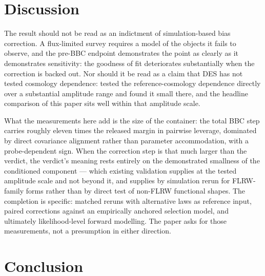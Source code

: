 \documentclass[11pt]{article}
\begin{document}
\section{Discussion}

The result should not be read as an indictment of simulation-based bias
correction. A flux-limited survey requires a model of the objects it
fails to observe, and the pre-BBC endpoint demonstrates the point as
clearly as it demonstrates sensitivity: the goodness of fit deteriorates
substantially when the correction is backed out. Nor should it be read as
a claim that DES has not tested cosmology dependence:
\citet{Camilleri2024} tested the reference-cosmology dependence directly
over a substantial amplitude range and found it small there, and the
headline comparison of this paper sits well within that amplitude scale.

What the measurements here add is the size of the container: the total
BBC step carries roughly eleven times the released margin in pairwise
leverage, dominated by direct covariance alignment rather than parameter
accommodation, with a probe-dependent sign. When the correction step is
that much larger than the verdict, the verdict's meaning rests entirely
on the demonstrated smallness of the conditioned component --- which
existing validation supplies at the tested amplitude scale and not
beyond it, and supplies by simulation rerun for FLRW-family forms rather
than by direct test of non-FLRW functional shapes. The completion is specific:
matched reruns with alternative laws as reference input, paired
corrections against an empirically anchored selection model, and
ultimately likelihood-level forward modelling. The paper asks for those
measurements, not a presumption in either direction.

\section{Conclusion}
\end{document}
